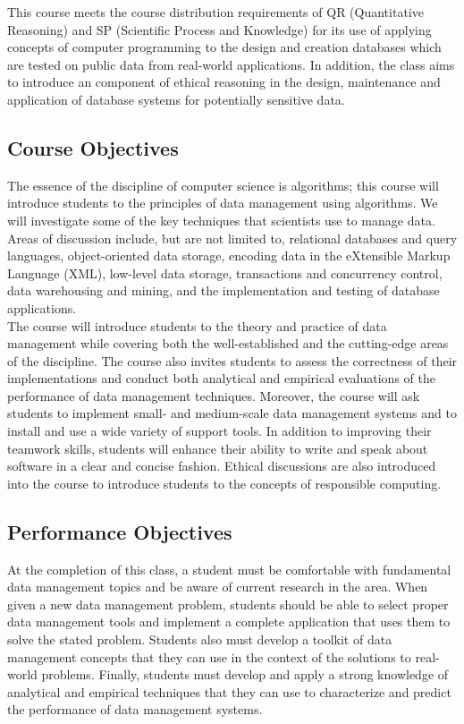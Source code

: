 \documentclass[11pt]{article} %
\begin{document}
This course meets the course distribution requirements of QR (Quantitative Reasoning) and SP (Scientific Process and Knowledge) for its use of applying concepts of computer programming to the design and creation databases which are tested on public data from real-world applications. In addition, the class aims to introduce an component of ethical reasoning in the design, maintenance and application of database systems for potentially sensitive data.

\subsection*{Course Objectives}

The essence of the discipline of computer science is algorithms; this course will introduce students to the principles of data management using algorithms.  We will investigate some of the key techniques that scientists use to manage data. Areas of discussion include, but are not limited to, relational databases and query languages, object-oriented data storage, encoding data in the eXtensible Markup Language (XML), low-level data storage, transactions and concurrency control, data warehousing and mining, and the implementation and testing of database applications.  \\

\noindent The course will introduce students to the theory and practice of data management while covering both the well-established and the cutting-edge areas of the discipline.  The course also invites students to assess the correctness of their implementations and conduct both analytical and empirical evaluations of the performance of data
management techniques.  Moreover, the course will ask students to implement small- and medium-scale data management systems and to install and use a wide variety of support tools. In addition to improving their teamwork skills, students will enhance their ability to write and speak about software in a clear and concise fashion. Ethical discussions are also introduced into the course to introduce students to the concepts of responsible computing. 


\subsection*{Performance Objectives}

At the completion of this class, a student must be comfortable with fundamental data management topics and be aware of current research in the area.  When given a new data management problem, students should be able to select proper data management tools and implement a complete application that uses them to solve the stated problem.  Students also must develop a toolkit of data management concepts that they can use in the context of the solutions to real-world problems. Finally, students must develop and apply a strong knowledge of analytical and empirical techniques that they can use to characterize and predict the performance of data management systems.\\
\end{document}
